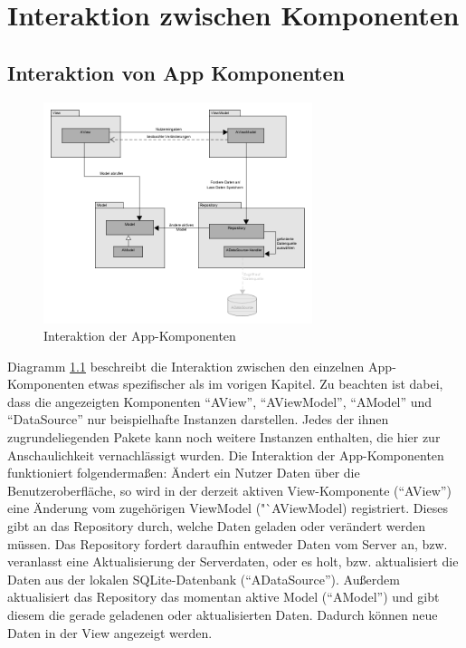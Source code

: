 \chapter{Interaktion zwischen Komponenten}

\section{Interaktion von App Komponenten}
 
\begin{figure}[H]
\centering
\includegraphics[width=0.7\textwidth]{pics/appComponentInteractions.png}%
\caption{Interaktion der App-Komponenten}%
\label{appcomp}%
\end{figure}


Diagramm \ref{appcomp} beschreibt die Interaktion zwischen den einzelnen App-Komponenten etwas spezifischer als im vorigen Kapitel.
Zu beachten ist dabei, dass die angezeigten Komponenten "`AView"', "`AViewModel"', "`AModel"' und "`DataSource"' nur beispielhafte Instanzen darstellen. Jedes der ihnen zugrundeliegenden Pakete kann noch weitere Instanzen enthalten, die hier zur Anschaulichkeit vernachlässigt wurden.
Die Interaktion der App-Komponenten funktioniert folgendermaßen:
Ändert ein Nutzer Daten über die Benutzeroberfläche, so wird in der derzeit aktiven View-Komponente ("`AView"') eine Änderung vom zugehörigen ViewModel ("`AViewModel) registriert. Dieses gibt an das Repository durch, welche Daten geladen oder verändert werden müssen. Das Repository fordert daraufhin entweder Daten vom Server an, bzw. veranlasst eine Aktualisierung der Serverdaten, oder es holt, bzw. aktualisiert die Daten aus der lokalen SQLite-Datenbank ("`ADataSource"'). Außerdem aktualisiert das Repository das momentan aktive Model ("`AModel"') und gibt diesem die gerade geladenen oder aktualisierten Daten. Dadurch können neue Daten in der View angezeigt werden.

